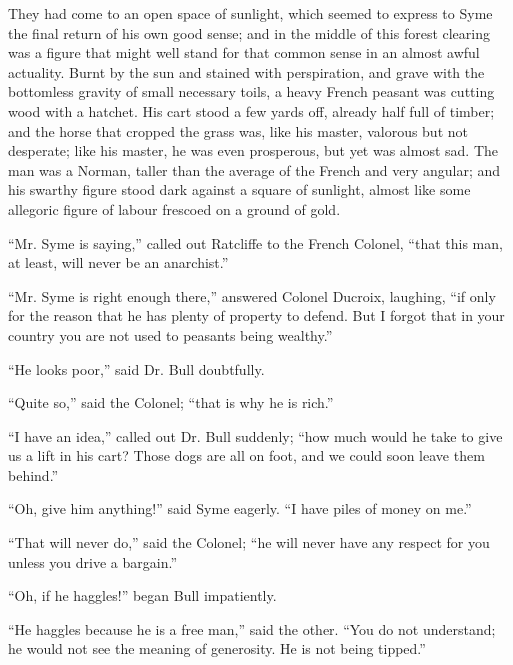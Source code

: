 They had come to an open space of sunlight, which seemed to express to Syme the final return of his own good sense; and in the middle of this forest clearing was a figure that might well stand for that common sense in an almost awful actuality. Burnt by the sun and stained with perspiration, and grave with the bottomless gravity of small necessary toils, a heavy French peasant was cutting wood with a hatchet. His cart stood a few yards off, already half full of timber; and the horse that cropped the grass was, like his master, valorous but not desperate; like his master, he was even prosperous, but yet was almost sad. The man was a Norman, taller than the average of the French and very angular; and his swarthy figure stood dark against a square of sunlight, almost like some allegoric figure of labour frescoed on a ground of gold.

“Mr. Syme is saying,” called out Ratcliffe to the French Colonel, “that this man, at least, will never be an anarchist.”

“Mr. Syme is right enough there,” answered Colonel Ducroix, laughing, “if only for the reason that he has plenty of property to defend. But I forgot that in your country you are not used to peasants being wealthy.”

“He looks poor,” said Dr. Bull doubtfully.

“Quite so,” said the Colonel; “that is why he is rich.”

“I have an idea,” called out Dr. Bull suddenly; “how much would he take to give us a lift in his cart? Those dogs are all on foot, and we could soon leave them behind.”

“Oh, give him anything!” said Syme eagerly. “I have piles of money on me.”

“That will never do,” said the Colonel; “he will never have any respect for you unless you drive a bargain.”

“Oh, if he haggles!” began Bull impatiently.

“He haggles because he is a free man,” said the other. “You do not understand; he would not see the meaning of generosity. He is not being tipped.”

